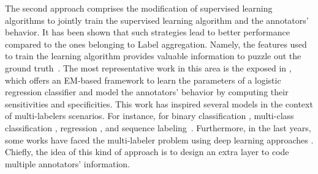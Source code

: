 \documentclass[journal]{IEEEtran}
\begin{document}
The second approach comprises the modification of supervised learning algorithms to jointly train the supervised learning algorithm and the annotators' behavior. It has been shown that such strategies lead to better performance compared to the ones belonging to Label aggregation. Namely, the features used to train the learning algorithm provides valuable information to puzzle out the ground truth~\cite{ruiz2019learning}. The most representative work in this area is the exposed in \cite{raykar2010learning}, which offers an EM-based framework to learn the parameters of a logistic regression classifier and model the annotators' behavior by computing their sensitivities and specificities. This work has inspired several models in the context of multi-labelers scenarios. For instance, for binary classification \cite{rodrigues2014gaussian,ruiz2019learning}, multi-class classification \cite{morales2019scalable,gonzalez2015automatic}, regression \cite{groot2011learning,rodrigues2017learning}, and sequence labeling~\cite{rodrigues2014sequence}. Furthermore, in the last years, some works have faced the multi-labeler problem using deep learning approaches \cite{albarqouni2016aggnet,rodrigues2018deep,guan2018said}. Chiefly, the idea of this kind of approach is to design an extra layer to code multiple annotators' information. 
\end{document}
